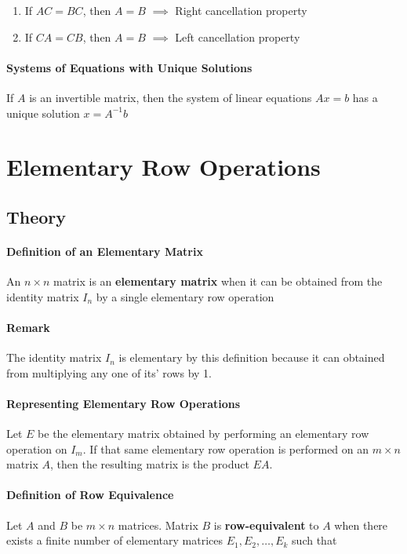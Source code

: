 \documentclass{report}
\begin{document}
\begin{enumerate}
    \item If $AC=BC$, then $A=B$ $\implies$ Right cancellation property
    \item If $CA = CB$, then $A=B$ $\implies$ Left cancellation property
\end{enumerate}

\paragraph{Systems of Equations with Unique Solutions}
If $A$ is an invertible matrix, then the system of linear equations $Ax=b$ has a unique solution $x=A^{-1}b$

\section{Elementary Row Operations}

\subsection{Theory}

\paragraph{Definition of an Elementary Matrix} An $n \times n$ matrix is an \textbf{elementary matrix} when it can be obtained from the identity matrix $I_n$ by a single elementary row operation

\paragraph{Remark} The identity matrix $I_n$ is elementary by this definition because it can obtained from multiplying any one of its' rows by 1.

\paragraph{Representing Elementary Row Operations} Let $E$ be the elementary matrix obtained by performing an elementary row operation on $I_m$. If that same elementary row operation is performed on an $m \times n$ matrix $A$, then the resulting matrix is the product $EA$.

\paragraph{Definition of Row Equivalence} Let $A$ and $B$ be $m \times n$ matrices. Matrix $B$ is \textbf{row-equivalent} to $A$ when there exists a finite number of elementary matrices $E_1, E_2, \hdots, E_k$ such that 
\end{document}
